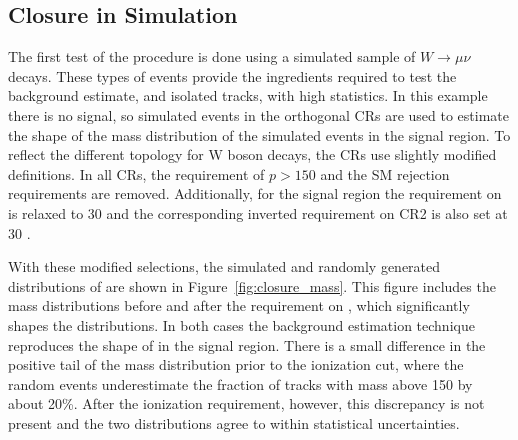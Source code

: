 \subsection{Closure in Simulation}
The first test of the procedure is done using a simulated sample of $W\rightarrow\mu\nu$ decays.
These types of events provide the ingredients required to test the background estimate, \met and isolated tracks, with high statistics.
In this example there is no signal, so simulated events in the orthogonal \acp{CR} are used to estimate the shape of the mass distribution of the simulated events in the signal region.
To reflect the different topology for W boson decays, the \acp{CR} use slightly modified definitions.
In all \acp{CR}, the requirement of $p > 150$ \GeV and the \ac{SM} rejection requirements are removed.
Additionally, for the signal region the requirement on \met is relaxed to 30 \GeV and the corresponding inverted requirement on CR2 is also set at 30 \GeV.

With these modified selections, the simulated and randomly generated distributions of \mdedx are shown in Figure~\ref{fig:closure_mass}. 
This figure includes the mass distributions before and after the requirement on \dedx, which significantly shapes the distributions.
In both cases the background estimation technique reproduces the shape of \mdedx in the signal region.
There is a small difference in the positive tail of the mass distribution prior to the ionization cut, where the random events underestimate the fraction of tracks with mass above 150 \GeV by about 20\%.
After the ionization requirement, however, this discrepancy is not present and the two distributions agree to within statistical uncertainties.

